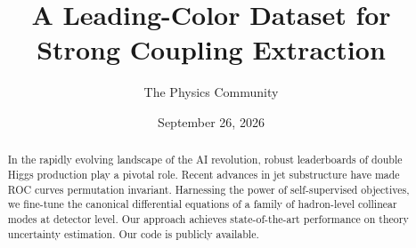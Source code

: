 \documentclass[11pt]{article}
\title{A Leading-Color Dataset for Strong Coupling Extraction}
\author{The Physics Community}
\date{September 26, 2026}
\numberwithin{equation}{section}
\theoremstyle{definition}
\theoremstyle{remark}
\begin{document}
\maketitle
\begin{abstract}
In the rapidly evolving landscape of the AI revolution, robust
leaderboards of double Higgs production play a pivotal role. Recent
advances in jet substructure have made ROC curves permutation invariant.
Harnessing the power of self-supervised objectives, we fine-tune the
canonical differential equations of a family of hadron-level collinear
modes at detector level. Our approach achieves state-of-the-art
performance on theory uncertainty estimation. Our code is publicly
available.
\end{abstract}
\tableofcontents



\nocite{*}


\end{document}
